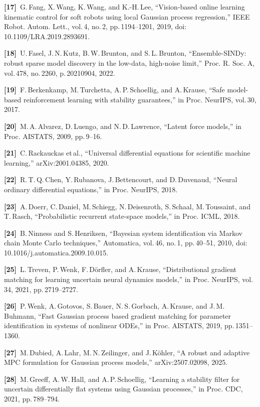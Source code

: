 \documentclass[letterpaper, 10pt, journal, twoside]{IEEEtran}
\begin{document}
\textbf{{[}17{]} }G.\,Fang, X.\,Wang, K.\,Wang, and K.-H.\,Lee,
``Vision-based online learning kinematic control for soft robots using
local Gaussian process regression,'' IEEE Robot. Autom. Lett., vol.\,4,
no.\,2, pp.\,1194--1201, 2019, doi:\,10.1109/LRA.2019.2893691.

\textbf{{[}18{]} }U.\,Fasel, J.\,N.\,Kutz, B.\,W.\,Brunton, and
S.\,L.\,Brunton, ``Ensemble-SINDy: robust sparse model discovery in the
low-data, high-noise limit,'' Proc. R. Soc. A, vol.\,478, no.\,2260,
p.\,20210904, 2022.

\textbf{{[}19{]} }F.\,Berkenkamp, M.\,Turchetta, A.\,P.\,Schoellig, and
A.\,Krause, ``Safe model-based reinforcement learning with stability
guarantees,'' in Proc. NeurIPS, vol.\,30, 2017.

\textbf{{[}20{]} }M.\,A.\,Alvarez, D.\,Luengo, and N.\,D.\,Lawrence,
``Latent force models,'' in Proc. AISTATS, 2009, pp.\,9--16.

\textbf{{[}21{]} }C.\,Rackauckas et\,al., ``Universal differential
equations for scientific machine learning,'' arXiv:2001.04385, 2020.

\textbf{{[}22{]} }R.\,T.\,Q.\,Chen, Y.\,Rubanova, J.\,Bettencourt, and
D.\,Duvenaud, ``Neural ordinary differential equations,'' in Proc.
NeurIPS, 2018.

\textbf{{[}23{]} }A.\,Doerr, C.\,Daniel, M.\,Schiegg, N.\,Deisenroth,
S.\,Schaal, M.\,Toussaint, and T.\,Rasch, ``Probabilistic recurrent
state-space models,'' in Proc. ICML, 2018.

\textbf{{[}24{]} }B.\,Ninness and S.\,Henriksen, ``Bayesian system
identification via Markov chain Monte Carlo techniques,'' Automatica,
vol.\,46, no.\,1, pp.\,40--51, 2010,
doi:\,10.1016/j.automatica.2009.10.015.

\textbf{{[}25{]} }L.\,Treven, P.\,Wenk, F.\,Dörfler, and A.\,Krause,
``Distributional gradient matching for learning uncertain neural
dynamics models,'' in Proc. NeurIPS, vol.\,34, 2021, pp.\,2719--2727.

\textbf{{[}26{]} }P.\,Wenk, A.\,Gotovos, S.\,Bauer, N.\,S.\,Gorbach,
A.\,Krause, and J.\,M.\,Buhmann, ``Fast Gaussian process based gradient
matching for parameter identification in systems of nonlinear ODEs,'' in
Proc. AISTATS, 2019, pp.\,1351--1360.

\textbf{{[}27{]} }M.\,Dubied, A.\,Lahr, M.\,N.\,Zeilinger, and
J.\,Köhler, ``A robust and adaptive MPC formulation for Gaussian process
models,'' arXiv:2507.02098, 2025.

\textbf{{[}28{]} }M.\,Greeff, A.\,W.\,Hall, and A.\,P.\,Schoellig,
``Learning a stability filter for uncertain differentially flat systems
using Gaussian processes,'' in Proc. CDC, 2021, pp.\,789--794.
\end{document}
